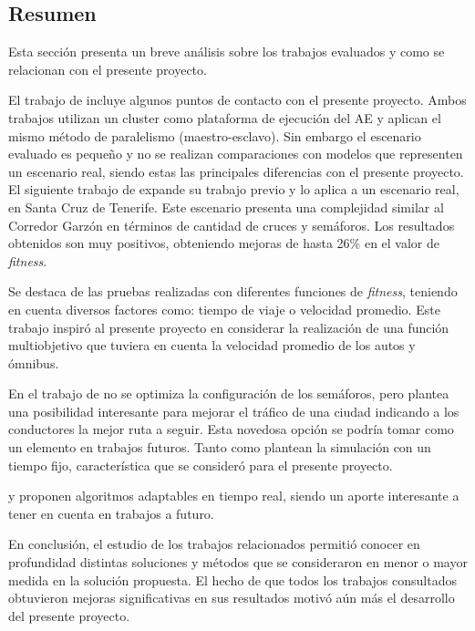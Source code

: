 \subsection{Resumen}
Esta sección presenta un breve análisis sobre los trabajos evaluados y como se relacionan con el presente proyecto.

El trabajo de \citet{Sanchez2004} incluye algunos puntos de contacto con el presente proyecto. Ambos trabajos utilizan un cluster como plataforma de ejecución del AE y aplican el mismo método de paralelismo (maestro-esclavo). Sin embargo el escenario evaluado es pequeño y no se realizan comparaciones con modelos que representen un escenario real, siendo estas las principales diferencias con el presente proyecto. El siguiente trabajo de \citet{Sanchez2008} expande su trabajo previo y lo aplica a un escenario real, en Santa Cruz de Tenerife. Este escenario presenta una complejidad similar al Corredor Garzón en términos de cantidad de cruces y semáforos. Los resultados obtenidos son muy positivos, obteniendo mejoras de hasta 26\% en el valor de \emph{fitness}.

Se destaca de \citet{Sanchez2010} las pruebas realizadas con diferentes funciones de \emph{fitness}, teniendo en cuenta diversos factores como: tiempo de viaje o velocidad promedio. Este trabajo inspiró al presente proyecto en considerar la realización de una función multiobjetivo que tuviera en cuenta la velocidad promedio de los autos y ómnibus.

En el trabajo de \citet{Stolfi2012} no se optimiza la configuración de los semáforos, pero plantea una posibilidad interesante para mejorar el tráfico de una ciudad indicando a los conductores la mejor ruta a seguir. Esta novedosa opción se podría tomar como un elemento en trabajos futuros. Tanto \citet{Teo2010} como \citet{Stolfi2012} plantean la simulación con un tiempo fijo, característica que se consideró para el presente proyecto.

\citet{Montana1996} y \citet{Vogel2000}  proponen algoritmos adaptables en tiempo real, siendo un aporte interesante a tener en cuenta en trabajos a futuro.

En conclusión, el estudio de los trabajos relacionados permitió conocer en profundidad distintas soluciones y métodos que se consideraron en menor o mayor medida en la solución propuesta. El hecho de que todos los trabajos consultados obtuvieron mejoras significativas en sus resultados motivó aún más el desarrollo del presente proyecto.

